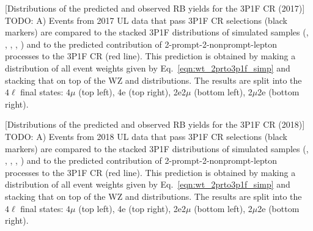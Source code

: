 \begin{multiFigure}
	\centering
		[Distributions of the predicted and observed RB yields for the 3P1F CR (2017)]
		{TODO:
		\;A)
		Events from 2017 UL data that pass 3P1F CR selections (black markers) 
		are compared to the stacked 3P1F distributions of simulated samples
		(\Zplusjets, \ttbarplusjets, \WZ, \ZZ, \Zgammastar)
		and to the predicted contribution of 2-prompt-2-nonprompt-lepton processes to the 3P1F CR (red line).
		This prediction is obtained by making a distribution of all event weights given by Eq.~\ref{eqn:wt_2prto3p1f_simp} and stacking that on top of the WZ and \ZZ distributions.
		The results are split into the $4\ell$ final states:
		$4\mu$ (top left), 4e (top right), 2e2$\mu$ (bottom left), 2$\mu$2e (bottom right).}
	\label{cr_plots_3p1f_2017}
\end{multiFigure}
\begin{multiFigure}
		[Distributions of the predicted and observed RB yields for the 3P1F CR (2018)]
		{TODO:
		\;A)
		Events from 2018 UL data that pass 3P1F CR selections (black markers) 
		are compared to the stacked 3P1F distributions of simulated samples
		(\Zplusjets, \ttbarplusjets, \WZ, \ZZ, \Zgammastar)
		and to the predicted contribution of 2-prompt-2-nonprompt-lepton processes to the 3P1F CR (red line).
		This prediction is obtained by making a distribution of all event weights given by Eq.~\ref{eqn:wt_2prto3p1f_simp} and stacking that on top of the WZ and \ZZ distributions.
		The results are split into the $4\ell$ final states:
		$4\mu$ (top left), 4e (top right), 2e2$\mu$ (bottom left), 2$\mu$2e (bottom right).}
	\label{cr_plots_3p1f_2018}
\end{multiFigure}

